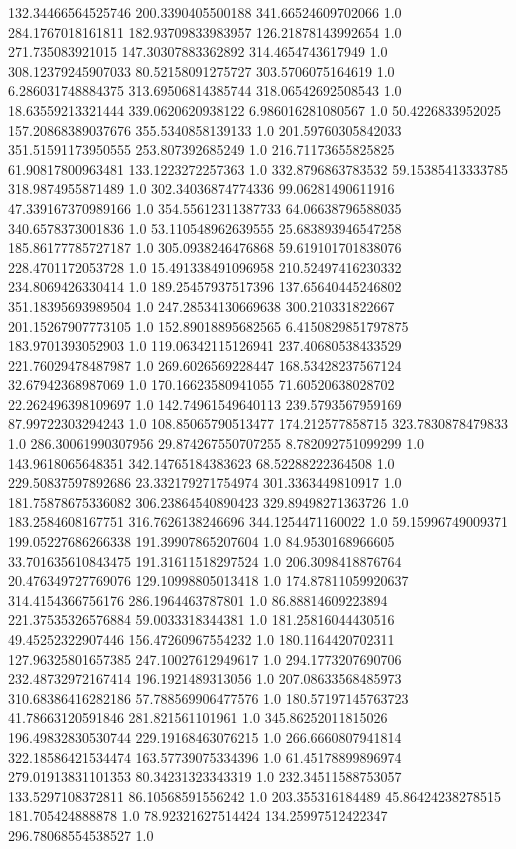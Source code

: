 132.34466564525746	200.3390405500188	341.66524609702066	1.0
284.1767018161811	182.93709833983957	126.21878143992654	1.0
271.735083921015	147.30307883362892	314.4654743617949	1.0
308.12379245907033	80.52158091275727	303.5706075164619	1.0
6.286031748884375	313.69506814385744	318.06542692508543	1.0
18.63559213321444	339.0620620938122	6.986016281080567	1.0
50.4226833952025	157.20868389037676	355.5340858139133	1.0
201.59760305842033	351.51591173950555	253.807392685249	1.0
216.71173655825825	61.90817800963481	133.1223272257363	1.0
332.8796863783532	59.15385413333785	318.9874955871489	1.0
302.34036874774336	99.06281490611916	47.339167370989166	1.0
354.55612311387733	64.06638796588035	340.6578373001836	1.0
53.110548962639555	25.683893946547258	185.86177785727187	1.0
305.0938246476868	59.619101701838076	228.4701172053728	1.0
15.491338491096958	210.52497416230332	234.8069426330414	1.0
189.25457937517396	137.65640445246802	351.18395693989504	1.0
247.28534130669638	300.210331822667	201.15267907773105	1.0
152.89018895682565	6.4150829851797875	183.9701393052903	1.0
119.06342115126941	237.40680538433529	221.76029478487987	1.0
269.6026569228447	168.53428237567124	32.67942368987069	1.0
170.16623580941055	71.60520638028702	22.262496398109697	1.0
142.74961549640113	239.5793567959169	87.99722303294243	1.0
108.85065790513477	174.212577858715	323.7830878479833	1.0
286.30061990307956	29.874267550707255	8.782092751099299	1.0
143.9618065648351	342.14765184383623	68.52288222364508	1.0
229.50837597892686	23.332179271754974	301.3363449810917	1.0
181.75878675336082	306.23864540890423	329.89498271363726	1.0
183.2584608167751	316.7626138246696	344.1254471160022	1.0
59.15996749009371	199.05227686266338	191.39907865207604	1.0
84.9530168966605	33.701635610843475	191.31611518297524	1.0
206.3098418876764	20.476349727769076	129.10998805013418	1.0
174.87811059920637	314.4154366756176	286.1964463787801	1.0
86.88814609223894	221.37535326576884	59.0033318344381	1.0
181.25816044430516	49.45252322907446	156.47260967554232	1.0
180.1164420702311	127.96325801657385	247.10027612949617	1.0
294.1773207690706	232.48732972167414	196.1921489313056	1.0
207.08633568485973	310.68386416282186	57.788569906477576	1.0
180.57197145763723	41.78663120591846	281.821561101961	1.0
345.86252011815026	196.49832830530744	229.19168463076215	1.0
266.6660807941814	322.18586421534474	163.57739075334396	1.0
61.45178899896974	279.01913831101353	80.34231323343319	1.0
232.34511588753057	133.5297108372811	86.10568591556242	1.0
203.355316184489	45.86424238278515	181.705424888878	1.0
78.92321627514424	134.25997512422347	296.78068554538527	1.0
